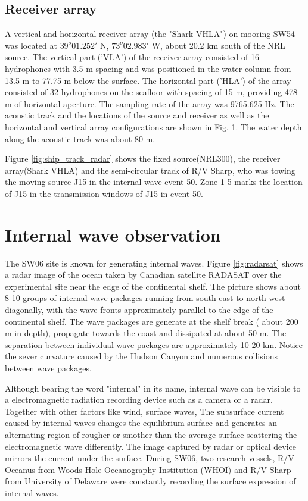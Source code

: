 \subsection{Receiver array}
 A vertical and
horizontal receiver array (the "Shark VHLA") on mooring SW54 was
located at $39^o01.252'$ N, $73^o02.983'$ W, about 20.2 km south of
the NRL source.  The vertical part ('VLA') of the receiver array consisted
of 16 hydrophones with 3.5 m spacing and was positioned in the water
column from 13.5 m to 77.75 m below the surface. The horizontal part ('HLA')
of the array consisted of 32 hydrophones on the seafloor with
spacing of 15 m, providing 478 m of horizontal aperture. The
sampling rate of the array was 9765.625 Hz. The acoustic track and
the locations of the source and receiver as well as the horizontal
and vertical array configurations are shown in Fig. 1. The water
depth along the acoustic track was about 80 m.

Figure \ref{fig:ship_track_radar} shows the fixed source(NRL300), the receiver array(Shark VHLA) and the semi-circular track of R/V Sharp, who was towing the moving source J15 in the internal wave event 50. Zone 1-5 marks the location of J15 in the transmission windows of J15 in event 50.

\section{Internal wave observation}
The SW06 site is known for generating internal waves. Figure \ref{fig:radarsat} shows a radar image of the ocean taken by Canadian satellite RADASAT over the experimental site near the edge of the continental shelf. The picture shows about 8-10 groups of internal wave packages running from south-east to north-west diagonally, with the wave fronts
approximately parallel to the edge of the continental shelf.  The wave packages are generate at the shelf break ( about 200 m in depth), propagate towards the coast and dissipated at about 50 m. The separation between individual wave packages are approximately 10-20 km. Notice the sever curvature caused by the Hudson Canyon and numerous collisions between wave packages.

Although bearing the word "internal" in its name, internal wave can be visible to a electromagnetic radiation recording device such as a camera or a radar. Together with other factors like wind, surface waves, The subsurface current caused by internal waves changes the equilibrium surface and generates an alternating region of rougher or smother than the average surface scattering the electromagnetic wave differently\cite{intro_apel_1995}\cite{intro_Kropfli_1999}. The image captured by radar or optical device mirrors the current under the surface. During SW06, two research vessels, R/V Oceanus from Woods Hole Oceanography Institution (WHOI) and R/V Sharp from University of Delaware were constantly recording the surface expression of internal waves. 




